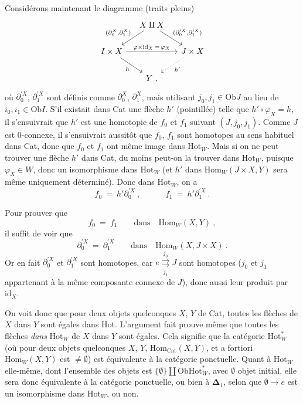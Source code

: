 \documentclass[11pt]{article}
\newcommand{\msp}[1]{\marginpar{\footnotesize [#1]}}
\newcommand{\Ob}{\mathrm{Ob}}
\newcommand{\Cat}{\mathrm{Cat}}
\newcommand{\id}{\mathrm{id}}
\newcommand{\Hot}{\mathrm{Hot}}
\newcommand{\Hom}{\mathrm{Hom}}
\begin{document}
\msp{page 128}Considérons maintenant le diagramme (traits pleins)
\[
\begin{tikzcd}[column sep=small]
& X\amalg X \arrow[dl, "{(\partial_0^X,\partial_1^X)}"'] \arrow[dr, "{(\partial_0^{\prime X},\partial_1^{\prime X})}"] & \\
I\times X \arrow[rr, "\varphi\times\id_X\,=\,\varphi_X"] \arrow[dr, "h"'] & & J\times X \arrow[dl, dotted, "h'"] \\
& Y\ , &
\end{tikzcd}
\]
où $\partial_0^{\prime X}$, $\partial_1^{\prime X}$ sont définis comme $\partial_0^X$, $\partial_1^X$, mais utilisant $j_0,j_1\in\Ob J$ au lieu de $i_0,i_1\in\Ob I$. S'il existait dans Cat une flèche $h'$ (pointillée) telle que $h'\circ\varphi_X=h$, il s'ensuivrait que $h'$ est une homotopie de $f_0$ et $f_1$ suivant $(J,j_0,j_1)$. Comme $J$ est 0-connexe, il s'ensuivrait aussitôt que $f_0$, $f_1$ sont homotopes au sens habituel dans Cat, donc que $f_0$ et $f_1$ ont même image dans $\Hot_W$. Mais si on ne peut trouver une flèche $h'$ dans Cat, du moins peut-on la trouver dans $\Hot_W$, puisque $\varphi_X\in W$, donc un isomorphisme dans $\Hot_W$ (et $h'$ dans $\Hom_W(J\times X,Y)$ sera même uniquement déterminé). Donc dans $\Hot_W$, on a
\[
f_0\ =\ h'\partial_0^{\prime X}\ ,\qquad\quad f_1\ =\ h'\partial_1^{\prime X}\ .
\]

\msp{page 129}Pour prouver que
\[
f_0\ =\ f_1\qquad\text{dans}\quad\Hom_W(X,Y)\ ,
\]
il suffit de voir que
\[
\partial_0^{\prime X}\ =\ \partial_1^{\prime X}\qquad\text{dans}\quad\Hom_W(X,J\times X)\ .
\]
Or en fait $\partial_0^{\prime X}$ et $\partial_1^{\prime X}$ sont homotopes, car $e\underset{j_1}{\overset{j_0}{\rightrightarrows}}J$ sont homotopes ($j_0$ et $j_1$ appartenant à la même composante connexe de $J$), donc aussi leur produit par $\id_X$.

On voit donc que pour deux objets quelconques $X$, $Y$ de Cat, toutes les flèches de $X$ dans $Y$ sont égales dans Hot. L'argument fait prouve même que toutes les flèches \textit{dans} $\Hot_W$ de $X$ dans $Y$ sont égales. Cela signifie que la catégorie $\Hot_W^*$ (où pour deux objets quelconques $X$, $Y$, $\Hom_{\Cat}(X,Y)$, et a fortiori $\Hom_W(X,Y)$ est $\neq\emptyset$) est équivalente à la catégorie ponctuelle. Quant à $\Hot_W$ elle-même, dont l'ensemble des objets est $\{\emptyset\}\amalg\Ob\Hot_W^*$, avec $\emptyset$ objet initial, elle sera donc équivalente à la catégorie ponctuelle, ou bien à $\boldsymbol{\Delta}_1$, selon que $\emptyset\longrightarrow e$ est un isomorphisme dans $\Hot_W$, ou non.
\end{document}
